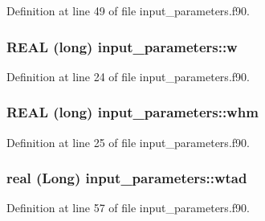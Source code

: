 Definition at line 49 of file input\_\-parameters.f90.

\hypertarget{namespaceinput__parameters_a745c6398e72faacdaacba0cf01027565}{
\subsubsection[{w}]{\setlength{\rightskip}{0pt plus 5cm}REAL (long) {\bf input\_\-parameters::w}}}
\label{namespaceinput__parameters_a745c6398e72faacdaacba0cf01027565}


Definition at line 24 of file input\_\-parameters.f90.

\hypertarget{namespaceinput__parameters_ae3a25357531dd0d2b8c5c4cc2de073d9}{
\subsubsection[{whm}]{\setlength{\rightskip}{0pt plus 5cm}REAL (long) {\bf input\_\-parameters::whm}}}
\label{namespaceinput__parameters_ae3a25357531dd0d2b8c5c4cc2de073d9}


Definition at line 25 of file input\_\-parameters.f90.

\hypertarget{namespaceinput__parameters_a8d452c8a3d45ee77279fc26867c74ed6}{
\subsubsection[{wtad}]{\setlength{\rightskip}{0pt plus 5cm}real (Long) {\bf input\_\-parameters::wtad}}}
\label{namespaceinput__parameters_a8d452c8a3d45ee77279fc26867c74ed6}


Definition at line 57 of file input\_\-parameters.f90.

